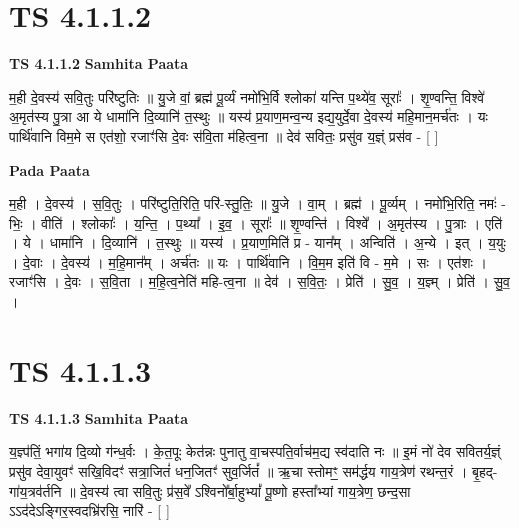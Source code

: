 \documentclass[17pt]{extarticle}
\begin{document}
\section*{ TS 4.1.1.2 }

\textbf{TS 4.1.1.2 } \newline
\textbf{Samhita Paata} \newline

म॒ही दे॒वस्य॑ सवि॒तुः परि॑ष्टुतिः ॥ यु॒जे वां॒ ब्रह्म॑ पू॒र्व्यं नमो॑भि॒र्वि श्लोका॑ यन्ति प॒थ्ये॑व॒ सूराः᳚ । शृ॒ण्वन्ति॒ विश्वे॑ अ॒मृत॑स्य पु॒त्रा आ ये धामा॑नि दि॒व्यानि॑ त॒स्थुः ॥ यस्य॑ प्र॒याण॒मन्व॒न्य इद्य॒युर्दे॒वा दे॒वस्य॑ महि॒मान॒मर्च॑तः । यः पार्थि॑वानि विम॒मे स एत॑शो॒ रजाꣳ॑सि दे॒वः स॑वि॒ता म॑हित्व॒ना ॥ देव॑ सवितः॒ प्रसु॑व य॒ज्ञ्ं प्रस॑व - [  ] \newline

\textbf{Pada Paata} \newline

म॒ही । दे॒वस्य॑ । स॒वि॒तुः । परि॑ष्टुति॒रिति॒ परि॑-स्तु॒तिः॒ ॥ यु॒जे । वा॒म् । ब्रह्म॑ । पू॒र्व्यम् । नमो॑भि॒रिति॒ नमः॑ - भिः॒ । वीति॑ । श्लोकाः᳚ । य॒न्ति॒ । प॒थ्या᳚ । इ॒व॒ । सूराः᳚ ॥ शृ॒ण्वन्ति॑ । विश्वे᳚ । अ॒मृत॑स्य । पु॒त्राः । एति॑ । ये । धामा॑नि । दि॒व्यानि॑ । त॒स्थुः ॥ यस्य॑ । प्र॒याण॒मिति॑ प्र - यान᳚म् । अन्विति॑ । अ॒न्ये । इत् । य॒युः । दे॒वाः । दे॒वस्य॑ । म॒हि॒मान᳚म् । अर्च॑तः ॥ यः । पार्थि॑वानि । वि॒म॒म इति॑ वि - म॒मे । सः । एत॑शः । रजाꣳ॑सि । दे॒वः । स॒वि॒ता । म॒हि॒त्व॒नेति॑ महि-त्व॒ना ॥ देव॑ । स॒वि॒तः॒ । प्रेति॑ । सु॒व॒ । य॒ज्ञ्म् । प्रेति॑ । सु॒व॒ ।  \newline




\section*{ TS 4.1.1.3 }

\textbf{TS 4.1.1.3 } \newline
\textbf{Samhita Paata} \newline

य॒ज्ञ्प॑तिं॒ भगा॑य दि॒व्यो ग॑न्ध॒र्वः । के॒त॒पूः केत॑न्नः पुनातु वा॒चस्पति॒र्वाच॑म॒द्य स्व॑दाति नः ॥ इ॒मं नो॑ देव सवितर्य॒ज्ञ्ं प्रसु॑व देवा॒युवꣳ॑ सखि॒विदꣳ॑ सत्रा॒जितं॑ धन॒जितꣳ॑ सुव॒र्जितं᳚ ॥ ऋ॒चा स्तोमꣳ॒॒ सम॑र्द्धय गाय॒त्रेण॑ रथन्त॒रं । बृ॒हद्-गा॑य॒त्रव॑र्तनि ॥ दे॒वस्य॑ त्वा सवि॒तुः प्र॑स॒वे᳚ ऽश्विनो᳚र्बा॒हुभ्यां᳚ पू॒ष्णो हस्ता᳚भ्यां गाय॒त्रेण॒ छन्द॒सा ऽऽद॑देऽङ्गिर॒स्वदभ्रि॑रसि॒ नारि॑ - [  ] \newline
\end{document}
